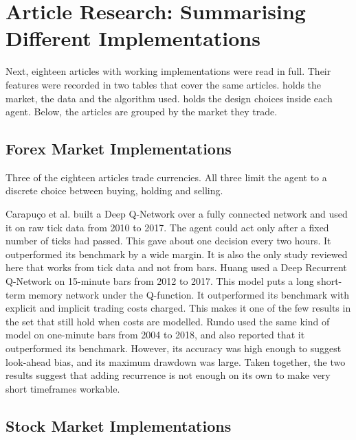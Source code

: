 \section{Article Research: Summarising Different Implementations}

Next, eighteen articles with working implementations were read in full. Their features were recorded in two tables that cover the same articles.  holds the market, the data and the algorithm used.  holds the design choices inside each agent. Below, the articles are grouped by the market they trade.


\subsection{Forex Market Implementations}

Three of the eighteen articles trade currencies. All three limit the agent to a discrete choice between buying, holding and selling.

Carapuço et al. \cite{carapuco_reinforcement_2018} built a Deep Q-Network over a fully connected network and used it on raw tick data from 2010 to 2017. The agent could act only after a fixed number of ticks had passed. This gave about one decision every two hours. It outperformed its benchmark by a wide margin. It is also the only study reviewed here that works from tick data and not from bars. Huang \cite{huang_financial_2018} used a Deep Recurrent Q-Network on 15-minute bars from 2012 to 2017. This model puts a long short-term memory network under the Q-function. It outperformed its benchmark with explicit and implicit trading costs charged. This makes it one of the few results in the set that still hold when costs are modelled. Rundo \cite{rundo_deep_2019} used the same kind of model on one-minute bars from 2004 to 2018, and also reported that it outperformed its benchmark. However, its accuracy was high enough to suggest look-ahead bias, and its maximum drawdown was large. Taken together, the two results suggest that adding recurrence is not enough on its own to make very short timeframes workable.

\subsection{Stock Market Implementations}

